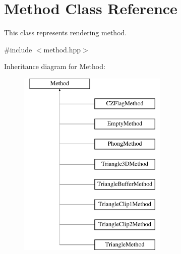 \hypertarget{classMethod}{}\section{Method Class Reference}
\label{classMethod}


This class represents rendering method.  




{\ttfamily \#include $<$method.\+hpp$>$}

Inheritance diagram for Method\+:\begin{figure}[H]
\begin{center}
\leavevmode
\includegraphics[height=9.000000cm]{classMethod}
\end{center}
\end{figure}

